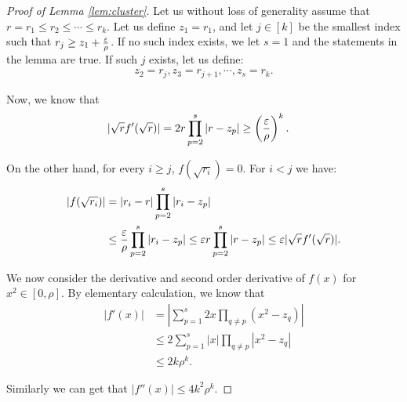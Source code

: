 \begin{proof}[Proof of Lemma \ref{lem:cluster}]
%
Let us without loss of generality assume that $r=r_1 \leq r_2 \leq \cdots \leq r_k$.  Let us define $z_1 = r_1$, and let $j \in [k ]$ be the smallest  index such that $r_j \geq z_1 + \frac{\varepsilon}{{\rho}}$. If no such index exists, we let $s = 1$ and the statements in the lemma are true.  If such $j$ exists, let us define:
\begin{align}
z_2 = r_j, z_3 = r_{j + 1}, \cdots, z_s = r_k.
\end{align}

Now, we know that 
\begin{align}
|\sqrt{r}f'(\sqrt{r})| &= 2 r \prod_{p = 2}^{s} |r - z_p| \geq  \left( \frac{ \varepsilon}{{\rho}} \right)^k.
\end{align}

On the other hand, for every $i \geq j$, $f(\sqrt{r_i}) = 0$. For $i < j$ we have: 
\begin{align}
|f(\sqrt{r_i})| &=  |r_i - r|\prod_{p = 2}^{s} |r_i - z_p|
\\
&\leq \frac{\varepsilon}{{\rho}} \prod_{p = 2}^{s} |r_i - z_p| \leq \varepsilon r \prod_{p = 2}^{s} |r - z_p|  \leq \varepsilon  |\sqrt{r} f'(\sqrt{r})|.
\end{align}


We now consider the derivative and second order derivative of $f(x)$ for $x^2 \in [0, \rho]$. By elementary calculation, we know that 
\begin{align}
|f'(x)| &= \left|\sum_{p = 1}^s 2x \prod_{q \not= p} (x^2 - z_q) \right|
\\
& \leq 2\sum_{p = 1}^s |x |  \prod_{q \not= p} \left| x^2 - z_q \right|
\\
& \leq 2 k \rho^k.
\end{align}

Similarly we can get that $|f''(x)| \leq 4k^2 \rho^k$. 
\end{proof}


